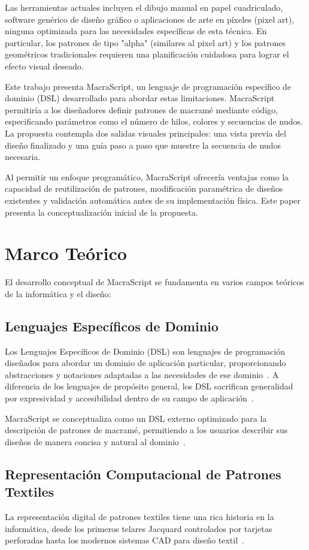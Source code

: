 \documentclass[conference]{IEEEtran}
\begin{document}
Las herramientas actuales incluyen el dibujo manual en papel cuadriculado, software genérico de diseño gráfico o aplicaciones de arte en píxeles (pixel art), ninguna optimizada para las necesidades específicas de esta técnica. En particular, los patrones de tipo "alpha" (similares al pixel art) y los patrones geométricos tradicionales requieren una planificación cuidadosa para lograr el efecto visual deseado.

Este trabajo presenta MacraScript, un lenguaje de programación específico de dominio (DSL) desarrollado para abordar estas limitaciones. MacraScript permitiría a los diseñadores definir patrones de macramé mediante código, especificando parámetros como el número de hilos, colores y secuencias de nudos. La propuesta contempla dos salidas visuales principales: una vista previa del diseño finalizado y una guía paso a paso que muestre la secuencia de nudos necesaria.

Al permitir un enfoque programático, MacraScript ofrecería ventajas como la capacidad de reutilización de patrones, modificación paramétrica de diseños existentes y validación automática antes de su implementación física. Este paper presenta la conceptualización inicial de la propuesta.

\section{Marco Teórico}
El desarrollo conceptual de MacraScript se fundamenta en varios campos teóricos de la informática y el diseño:

\subsection{Lenguajes Específicos de Dominio}
Los Lenguajes Específicos de Dominio (DSL) son lenguajes de programación diseñados para abordar un dominio de aplicación particular, proporcionando abstracciones y notaciones adaptadas a las necesidades de ese dominio~\cite{fowler2010}. A diferencia de los lenguajes de propósito general, los DSL sacrifican generalidad por expresividad y accesibilidad dentro de su campo de aplicación~\cite{mernik2005}.

MacraScript se conceptualiza como un DSL externo optimizado para la descripción de patrones de macramé, permitiendo a los usuarios describir sus diseños de manera concisa y natural al dominio~\cite{voelter2013}.

\subsection{Representación Computacional de Patrones Textiles}
La representación digital de patrones textiles tiene una rica historia en la informática, desde los primeros telares Jacquard controlados por tarjetas perforadas hasta los modernos sistemas CAD para diseño textil~\cite{rochford2019}. 
\end{document}

